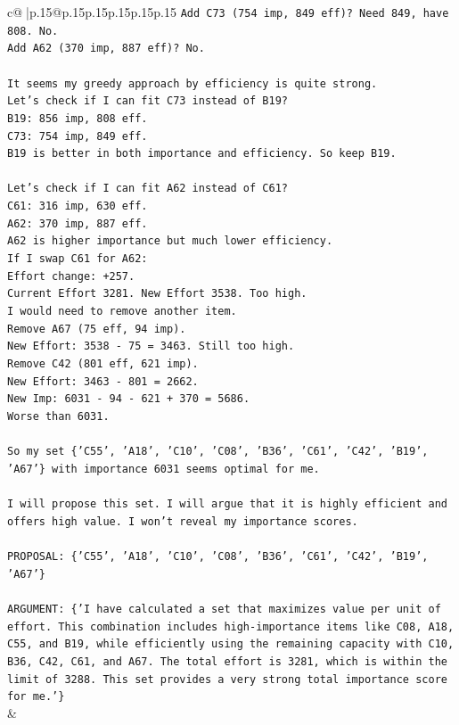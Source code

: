 \documentclass{article}
\begin{document}
{\begin{supertabular}{c@{$\;$}|p{.15\linewidth}@{}p{.15\linewidth}p{.15\linewidth}p{.15\linewidth}p{.15\linewidth}p{.15\linewidth}}
{{{\texttt{Add C73 (754 imp, 849 eff)? Need 849, have 808. No.} \\
\texttt{Add A62 (370 imp, 887 eff)? No.} \\
\\ 
\texttt{It seems my greedy approach by efficiency is quite strong.} \\
\texttt{Let's check if I can fit C73 instead of B19?} \\
\texttt{B19: 856 imp, 808 eff.} \\
\texttt{C73: 754 imp, 849 eff.} \\
\texttt{B19 is better in both importance and efficiency. So keep B19.} \\
\\ 
\texttt{Let's check if I can fit A62 instead of C61?} \\
\texttt{C61: 316 imp, 630 eff.} \\
\texttt{A62: 370 imp, 887 eff.} \\
\texttt{A62 is higher importance but much lower efficiency.} \\
\texttt{If I swap C61 for A62:} \\
\texttt{Effort change: +257.} \\
\texttt{Current Effort 3281. New Effort 3538. Too high.} \\
\texttt{I would need to remove another item.} \\
\texttt{Remove A67 (75 eff, 94 imp).} \\
\texttt{New Effort: 3538 {-} 75 = 3463. Still too high.} \\
\texttt{Remove C42 (801 eff, 621 imp).} \\
\texttt{New Effort: 3463 {-} 801 = 2662.} \\
\texttt{New Imp: 6031 {-} 94 {-} 621 + 370 = 5686.} \\
\texttt{Worse than 6031.} \\
\\ 
\texttt{So my set \{'C55', 'A18', 'C10', 'C08', 'B36', 'C61', 'C42', 'B19', 'A67'\} with importance 6031 seems optimal for me.} \\
\\ 
\texttt{I will propose this set. I will argue that it is highly efficient and offers high value. I won't reveal my importance scores.} \\
\\ 
\texttt{PROPOSAL: \{'C55', 'A18', 'C10', 'C08', 'B36', 'C61', 'C42', 'B19', 'A67'\}} \\
\\ 
\texttt{ARGUMENT: \{'I have calculated a set that maximizes value per unit of effort. This combination includes high{-}importance items like C08, A18, C55, and B19, while efficiently using the remaining capacity with C10, B36, C42, C61, and A67. The total effort is 3281, which is within the limit of 3288. This set provides a very strong total importance score for me.'\}} \\
            }
        }
    }
    & \\ \\


\end{supertabular}}
\end{document}
